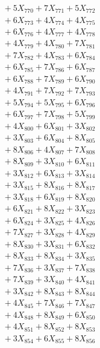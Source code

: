 \documentclass[a4paper,10pt]{article}
\begin{document}
{\begin{align}
&\;  + 5 X_{770} + 7 X_{771} + 5 X_{772} \\[0.3ex]
&\;  + 6 X_{773} + 4 X_{774} + 4 X_{775} \\[0.3ex]
&\;  + 6 X_{776} + 4 X_{777} + 4 X_{778} \\[0.3ex]
&\;  + 4 X_{779} + 4 X_{780} + 7 X_{781} \\[0.3ex]
&\;  + 7 X_{782} + 4 X_{783} + 6 X_{784} \\[0.3ex]
&\;  + 6 X_{785} + 7 X_{786} + 6 X_{787} \\[0.3ex]
&\;  + 6 X_{788} + 7 X_{789} + 6 X_{790} \\[0.5ex]\allowbreak
&\;  + 4 X_{791} + 7 X_{792} + 7 X_{793} \\[0.3ex]
&\;  + 5 X_{794} + 5 X_{795} + 6 X_{796} \\[0.3ex]
&\;  + 6 X_{797} + 7 X_{798} + 5 X_{799} \\[0.3ex]
&\;  + 4 X_{800} + 6 X_{801} + 3 X_{802} \\[0.3ex]
&\;  + 3 X_{803} + 6 X_{804} + 8 X_{805} \\[0.3ex]
&\;  + 8 X_{806} + 4 X_{807} + 7 X_{808} \\[0.3ex]
&\;  + 8 X_{809} + 3 X_{810} + 6 X_{811} \\[0.3ex]
&\;  + 3 X_{812} + 6 X_{813} + 3 X_{814} \\[0.3ex]
&\;  + 3 X_{815} + 8 X_{816} + 8 X_{817} \\[0.3ex]
&\;  + 3 X_{818} + 6 X_{819} + 8 X_{820} \\[0.5ex]\allowbreak
&\;  + 6 X_{821} + 8 X_{822} + 3 X_{823} \\[0.3ex]
&\;  + 6 X_{824} + 3 X_{825} + 4 X_{826} \\[0.3ex]
&\;  + 7 X_{827} + 3 X_{828} + 4 X_{829} \\[0.3ex]
&\;  + 8 X_{830} + 3 X_{831} + 6 X_{832} \\[0.3ex]
&\;  + 8 X_{833} + 8 X_{834} + 3 X_{835} \\[0.3ex]
&\;  + 7 X_{836} + 3 X_{837} + 7 X_{838} \\[0.3ex]
&\;  + 7 X_{839} + 3 X_{840} + 4 X_{841} \\[0.3ex]
&\;  + 3 X_{842} + 8 X_{843} + 8 X_{844} \\[0.3ex]
&\;  + 4 X_{845} + 7 X_{846} + 7 X_{847} \\[0.3ex]
&\;  + 4 X_{848} + 8 X_{849} + 6 X_{850} \\[0.5ex]\allowbreak
&\;  + 4 X_{851} + 8 X_{852} + 8 X_{853} \\[0.3ex]
&\;  + 3 X_{854} + 6 X_{855} + 8 X_{856} \\[0.3ex]

\end{align}}
\end{document}
